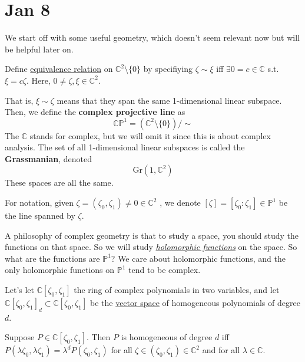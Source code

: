 \section{Jan 8} 

  We start off with some useful geometry, which doesn't seem relevant now but will be helpful later on. 

  \begin{definition}
    \label{def:complex-projective-line}
    Define \hyperref[st-def:equivalence_relation]{equivalence relation} on $\mathbb{C}^2 \setminus \{ 0\}$ by specifiying $\zeta \sim \xi$ iff $\exists 0 = c \in \mathbb{C}$ s.t. $\xi = c \zeta$. Here, $0 \neq \zeta, \xi \in \mathbb{C}^2$. 

    That is, $\xi \sim \zeta$ means that they span the same 1-dimensional linear subspace. Then, we define the \textbf{complex projective line} as 
    \begin{equation}
      \mathbb{CP}^1 = (\mathbb{C}^2 \setminus \{0\}) / \sim
    \end{equation} 
    The $\mathbb{C}$ stands for complex, but we will omit it since this is about complex analysis. The set of all 1-dimensional linear subspaces is called the \textbf{Grassmanian}, denoted
    \begin{equation}
      \mathrm{Gr}(1, \mathbb{C}^2) 
    \end{equation}
    These spaces are all the same. 
  \end{definition}

  For notation, given $\zeta = (\zeta_0, \zeta_1) \neq 0 \in \mathbb{C}^2$ , we denote $[\zeta] = [\zeta_0 : \zeta_1] \in \mathbb{P}^1$ be the line spanned by $\zeta$. 

  A philosophy of complex geometry is that to study a space, you should study the functions on that space. So we will study \textit{\hyperref[def:holomorphic-function]{holomorphic functions}} on the space. So what are the functions are $\mathbb{P}^1$? We care about holomorphic functions, and the only holomorphic functions on $\mathbb{P}^1$ tend to be complex. 

  Let's let $\mathbb{C}[\zeta_0, \zeta_1]$ the ring of complex polynomials in two variables, and let $\mathbb{C}[\zeta_0, \zeta_1]_d \subset \mathbb{C}[\zeta_0, \zeta_1]$ be the \hyperref[lin-def:vector-space]{vector space} of homogeneous polynomials of degree $d$. 

  Suppose $P \in \mathbb{C}[\zeta_0, \zeta_1]$. Then $P$ is homogeneous of degree $d$ iff $P(\lambda \zeta_0, \lambda \zeta_1) = \lambda^d P (\zeta_0, \zeta_1)$ for all $\zeta \in (\zeta_0, \zeta_1) \in \mathbb{C}^2$ and for all $\lambda \in \mathbb{C}$. 

